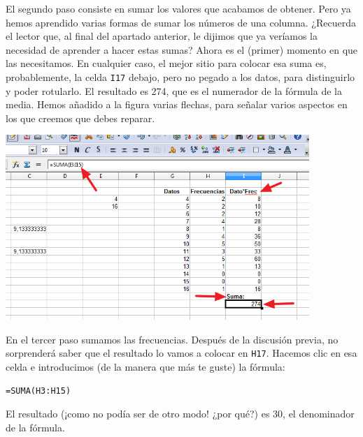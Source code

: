 \documentclass[10pt,a4paper]{article}\usepackage[]{graphicx}\usepackage[]{color}
\begin{document}
El segundo paso consiste en sumar los valores que acabamos de obtener. Pero ya hemos aprendido varias formas de sumar los números de una columna. ¿Recuerda el lector que, al final del apartado anterior, le dijimos que ya veríamos la necesidad de aprender a hacer estas sumas? Ahora es el (primer) momento en que las necesitamos. En cualquier caso, el mejor sitio para colocar esa suma
es, probablemente, la celda {\tt I17} debajo, pero no pegado a los datos, para distinguirlo y poder rotularlo. El resultado es 274, que es el numerador de la fórmula de la media. Hemos añadido a la figura varias flechas, para señalar varios aspectos en los que creemos que debes reparar.
    \begin{center}
    \includegraphics[height=7cm]{../fig/Tut01-Calc-Formula-26.png}
    \end{center}
En el tercer paso sumamos las frecuencias. Después de la discusión previa, no sorprenderá saber que el resultado lo vamos a colocar en {\tt H17}. Hacemos clic en esa celda e introducimos (de la manera que más te guste) la fórmula:
\begin{center}
{\tt =SUMA(H3:H15)}
\end{center}
El resultado (¡como no podía ser de otro modo! ¿por qué?) es 30, el denominador de la fórmula.
\end{document}
